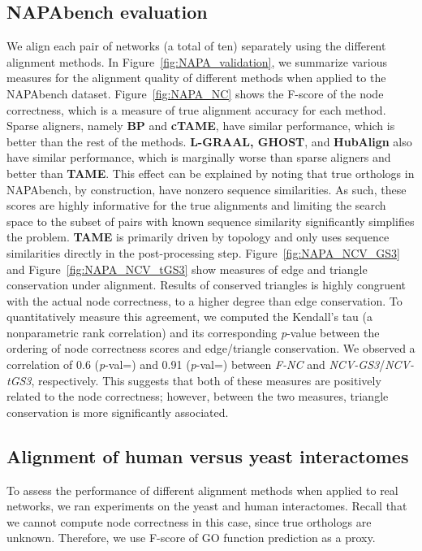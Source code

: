 \documentclass[10pt, journal, compsoc, final]{IEEEtran}
\begin{document}
\subsection{NAPAbench evaluation}

We align each pair of networks (a total of ten) separately using the different alignment methods. 
In Figure~\ref{fig:NAPA_validation}, we summarize various measures for the alignment quality of different methods when applied to the NAPAbench dataset. Figure~\ref{fig:NAPA_NC} shows the F-score of the node correctness, which is a measure of true alignment accuracy for each method. Sparse aligners, namely \textbf{BP} and \textbf{cTAME}, have similar performance, which is better than
the rest of the methods. \textbf{L-GRAAL, GHOST}, and \textbf{HubAlign} also have similar performance, which is marginally worse than sparse aligners and better than \textbf{TAME}. This effect can be explained by noting that true orthologs in NAPAbench, by construction, have nonzero sequence similarities. As such, these scores are highly informative for the true alignments and limiting the search space to the subset of pairs with known sequence similarity significantly simplifies the problem. \textbf{TAME} is primarily driven by topology and only uses sequence similarities directly in the post-processing step. Figure~\ref{fig:NAPA_NCV_GS3} and Figure~\ref{fig:NAPA_NCV_tGS3} show  measures of edge and triangle conservation under alignment. Results of conserved triangles is highly congruent with the actual node correctness, to a higher degree than edge conservation. To quantitatively measure this agreement, we computed the Kendall's tau (a nonparametric rank correlation) and its corresponding \emph{p}-value between the ordering of node correctness scores and edge/triangle conservation. We observed a correlation of 0.6 (\emph{p}-val=) and 0.91 (\emph{p}-val=) between \textit{F-NC} and \textit{NCV-GS3}/\textit{NCV-tGS3}, respectively. This suggests that both of these measures are positively related to the node correctness; however, between the two measures, triangle conservation is more significantly associated.




\subsection{Alignment of human versus yeast interactomes}

To assess the performance of different alignment methods when applied to real networks, we 
ran experiments on the yeast and human interactomes.  Recall that we cannot compute node correctness in this
case, since true orthologs are unknown. Therefore, we use F-score of GO function prediction as a proxy. 
\end{document}
